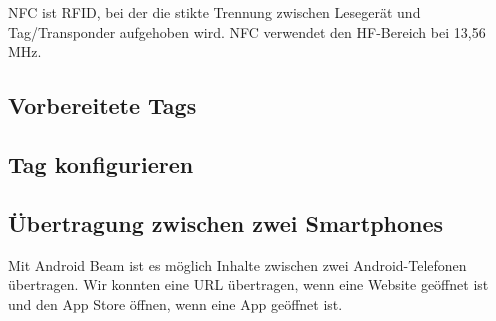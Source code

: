 \documentclass[paper=a4,fontsize=11pt,headsepline,footsepline,parskip=half]{scrartcl}
\begin{document}
NFC ist RFID, bei der die stikte Trennung zwischen Lesegerät und Tag/Transponder aufgehoben wird.
NFC verwendet den HF-Bereich bei 13,56 MHz.

\subsection{Vorbereitete Tags}

\subsection{Tag konfigurieren}

\subsection{Übertragung zwischen zwei Smartphones}

Mit Android Beam ist es möglich Inhalte zwischen zwei Android-Telefonen übertragen.
Wir konnten eine URL übertragen, wenn eine Website geöffnet ist und den App Store
öffnen, wenn eine App geöffnet ist.
\end{document}
